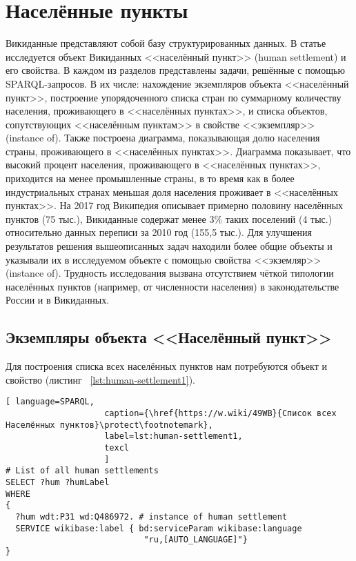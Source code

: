 \chapter{Населённые пункты}
\label{ch:human-settlement}

	Викиданные представляют собой базу структурированных данных. В статье исследуется объект Викиданных <<населённый пункт>> (human settlement) и его свойства. 
В каждом из разделов представлены задачи, решённые с помощью SPARQL-запросов. В их числе: нахождение экземпляров объекта <<населённый пункт>>, построение
упорядоченного списка стран по суммарному количеству населения, проживающего в <<населённых пунктах>>, и списка объектов, сопутствующих <<населённым 
пунктам>> в свойстве <<экземпляр>> (instance of). Также построена диаграмма, показывающая долю населения страны, проживающего в <<населённых пунктах>>. 
Диаграмма показывает, что высокий процент населения, проживающего в <<населённых пунктах>>, приходится на менее промышленные страны, в то время как в более 
индустриальных странах меньшая доля населения проживает в <<населённых пунктах>>. На 2017 год Википедия описывает примерно половину населённых пунктов 
(75 тыс.), Викиданные содержат менее 3\% таких поселений (4 тыс.) относительно данных переписи за 2010 год (155,5 тыс.). Для улучшения результатов решения 
вышеописанных задач находили более общие объекты и указывали их в исследуемом объекте с помощью свойства <<экземляр>> (instance of). Трудность исследования 
вызвана отсутствием чёткой типологии населённых пунктов (например, от численности населения) в законодательстве России и в Викиданных.

\section{Экземпляры объекта <<Населённый пункт>>}

Для построения списка всех населённых пунктов нам потребуются объект 
 и свойство  
(листинг ~\protect\ref{lst:human-settlement1}).

\begin{lstlisting}[ language=SPARQL, 
                    caption={\href{https://w.wiki/49WB}{Список всех Населённых пунктов}\protect\footnotemark},
                    label=lst:human-settlement1,
                    texcl 
                    ]
# List of all human settlements
SELECT ?hum ?humLabel 
WHERE 
{
  ?hum wdt:P31 wd:Q486972. # instance of human settlement  
  SERVICE wikibase:label { bd:serviceParam wikibase:language 
							"ru,[AUTO_LANGUAGE]"}
}
\end{lstlisting}%

